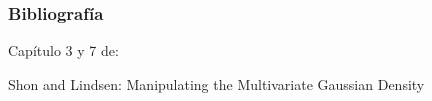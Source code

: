 \begin{frame}
	\frametitle{Bibliografía}
	
	Capítulo 3 y 7 de: \cite{thrun2005probabilistic}
	
	Shon and Lindsen: Manipulating the Multivariate Gaussian Density
	
	\printbibliography
	
\end{frame}